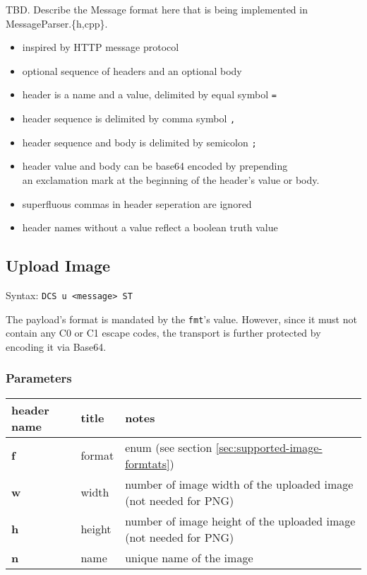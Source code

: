 \documentclass[a4paper]{article}
\newcommand{\code}[1]{\colorbox{light-gray}{\texttt{#1}}}
\begin{document}

TBD. Describe the Message format here that is being implemented in MessageParser.\{h,cpp\}.

\begin{itemize}
    \item inspired by HTTP message protocol
    \item optional sequence of headers and an optional body
    \item header is a name and a value, delimited by equal symbol \code{=}
    \item header sequence is delimited by comma symbol \code{,}
    \item header sequence and body is delimited by semicolon \code{;}
    \item header value and body can be base64 encoded by prepending \\
        an exclamation mark at the beginning of the header's value or body.
    \item superfluous commas in header seperation are ignored
    \item header names without a value reflect a boolean truth value
\end{itemize}

\subsection{Upload Image}

Syntax: \code{DCS u <message> ST}

The payload's format is mandated by the \code{fmt}'s value. However, since it must not contain
any C0 or C1 escape codes, the transport is further protected by encoding it via Base64.

\subsubsection*{Parameters}

\begin{tabular}{ |l|l|l| }
    \hline
    \textbf{header name}   & \textbf{title}   & \textbf{notes} \\
    \hline
    \textbf{f}       & format & enum (see section \ref{sec:supported-image-formtats}) \\
    \textbf{w}       & width & number of image width of the uploaded image (not needed for PNG) \\
    \textbf{h}       & height & number of image height of the uploaded image (not needed for PNG) \\
    \textbf{n}       & name & unique name of the image \\
    \hline
\end{tabular}
\end{document}
